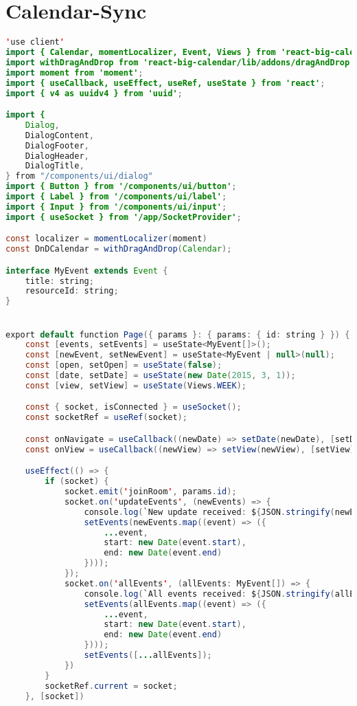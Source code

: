 \section{Calendar-Sync}
\vspace{6pt}
\begin{lstlisting}[language=Java, caption={Calendar Page}, label={lst:java}]
'use client'
import { Calendar, momentLocalizer, Event, Views } from 'react-big-calendar';
import withDragAndDrop from 'react-big-calendar/lib/addons/dragAndDrop';
import moment from 'moment';
import { useCallback, useEffect, useRef, useState } from 'react';
import { v4 as uuidv4 } from 'uuid';

import {
    Dialog,
    DialogContent,
    DialogFooter,
    DialogHeader,
    DialogTitle,
} from "/components/ui/dialog"
import { Button } from '/components/ui/button';
import { Label } from '/components/ui/label';
import { Input } from '/components/ui/input';
import { useSocket } from '/app/SocketProvider';

const localizer = momentLocalizer(moment)
const DnDCalendar = withDragAndDrop(Calendar);

interface MyEvent extends Event {
    title: string;
    resourceId: string;
}


export default function Page({ params }: { params: { id: string } }) {
    const [events, setEvents] = useState<MyEvent[]>();
    const [newEvent, setNewEvent] = useState<MyEvent | null>(null);
    const [open, setOpen] = useState(false);
    const [date, setDate] = useState(new Date(2015, 3, 1));
    const [view, setView] = useState(Views.WEEK);

    const { socket, isConnected } = useSocket();
    const socketRef = useRef(socket);

    const onNavigate = useCallback((newDate) => setDate(newDate), [setDate])
    const onView = useCallback((newView) => setView(newView), [setView])

    useEffect(() => {
        if (socket) {
            socket.emit('joinRoom', params.id);
            socket.on('updateEvents', (newEvents) => {
                console.log(`New update received: ${JSON.stringify(newEvents)}`);
                setEvents(newEvents.map((event) => ({
                    ...event,
                    start: new Date(event.start),
                    end: new Date(event.end)
                })));
            });
            socket.on('allEvents', (allEvents: MyEvent[]) => {
                console.log(`All events received: ${JSON.stringify(allEvents)}`);
                setEvents(allEvents.map((event) => ({
                    ...event,
                    start: new Date(event.start),
                    end: new Date(event.end)
                })));
                setEvents([...allEvents]);
            })
        }
        socketRef.current = socket;
    }, [socket])


\end{lstlisting}
